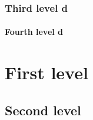 \section{Third level d}
\label{thirdleveld}

\subsection{Fourth level d}
\label{fourthleveld}

\part{First level}
\label{firstlevele}

\chapter{Second level}
\label{secondlevele}



